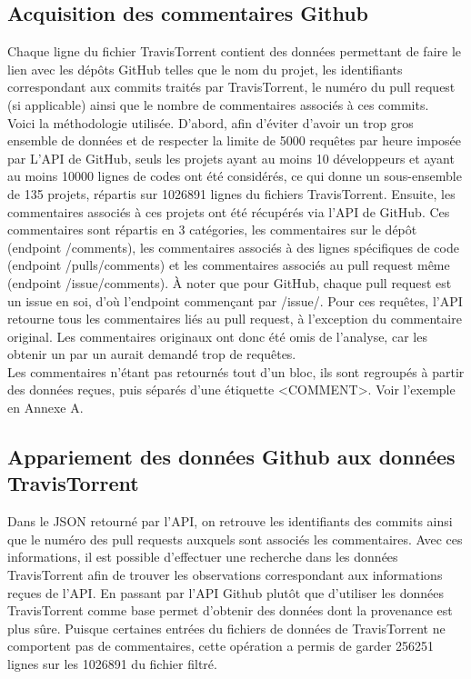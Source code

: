 \documentclass[10pt, conference]{IEEEtran}
\begin{document}
\subsection{Acquisition des commentaires Github}
Chaque ligne du fichier TravisTorrent contient des données permettant de faire le lien avec les dépôts GitHub telles que le nom du projet, les identifiants correspondant aux commits traités par TravisTorrent, le numéro du pull request (si applicable) ainsi que le nombre de commentaires associés à ces commits. \\
Voici la méthodologie utilisée. D'abord, afin d'éviter d'avoir un trop gros ensemble de données et de respecter la limite de 5000 requêtes par heure imposée par L'API de GitHub, seuls les projets ayant au moins 10 développeurs et ayant au moins 10000 lignes de codes ont été considérés, ce qui donne un sous-ensemble de 135 projets, répartis sur 1026891 lignes du fichiers TravisTorrent. Ensuite, les commentaires associés à ces projets ont été récupérés via l'API de GitHub. Ces commentaires sont répartis en 3 catégories, les commentaires sur le dépôt (endpoint /comments), les commentaires associés à des lignes spécifiques de code (endpoint /pulls/comments) et les commentaires associés au pull request même (endpoint /issue/comments). À noter que pour GitHub, chaque pull request est un issue en soi, d'où l'endpoint commençant par /issue/. Pour ces requêtes, l’API retourne tous les commentaires liés au pull request, à l’exception du commentaire original. Les commentaires originaux ont donc été omis de l’analyse, car les obtenir un par un aurait demandé trop de requêtes. \\
Les commentaires n’étant pas retournés tout d’un bloc, ils sont regroupés à partir des données reçues, puis séparés d’une étiquette \textless COMMENT\textgreater. Voir l’exemple en Annexe A.

\subsection{Appariement des données Github aux données TravisTorrent}
Dans le JSON retourné par l'API, on retrouve les identifiants des commits ainsi que le numéro des pull requests auxquels sont associés les commentaires. Avec ces informations, il est possible d’effectuer une recherche dans les données TravisTorrent afin de trouver les observations  correspondant aux informations reçues de l'API. En passant par l’API Github plutôt que d’utiliser les données TravisTorrent comme base permet d’obtenir des données dont la provenance est plus sûre.  Puisque certaines entrées du fichiers de données de TravisTorrent ne comportent pas de commentaires, cette opération a permis de garder 256251 lignes sur les 1026891 du fichier filtré. 
\end{document}
